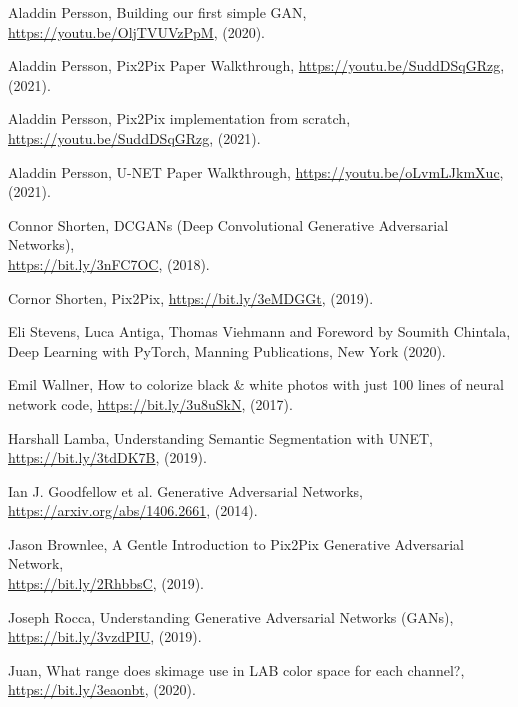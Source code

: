 \documentclass[a4paper]{article}
\begin{document}
\begin{thebibliography}{80}\label{references}

     Aladdin Persson, Building our first simple GAN, \href{https://youtu.be/OljTVUVzPpM}{https://youtu.be/OljTVUVzPpM}, (2020).

     Aladdin Persson, Pix2Pix Paper Walkthrough, \href{https://youtu.be/SuddDSqGRzg}{https://youtu.be/SuddDSqGRzg}, (2021).

     Aladdin Persson, Pix2Pix implementation from scratch, \href{https://youtu.be/SuddDSqGRzg}{https://youtu.be/SuddDSqGRzg}, (2021).

     Aladdin Persson, U-NET Paper Walkthrough, \href{https://youtu.be/oLvmLJkmXuc}{https://youtu.be/oLvmLJkmXuc}, (2021).

     Connor Shorten, DCGANs (Deep Convolutional Generative Adversarial Networks),\\ \href{https://bit.ly/3nFC7OC}{https://bit.ly/3nFC7OC}, (2018).

     Cornor Shorten, Pix2Pix, \href{https://bit.ly/3eMDGGt}{https://bit.ly/3eMDGGt}, (2019).

     Eli Stevens, Luca Antiga, Thomas Viehmann and Foreword by Soumith Chintala, Deep Learning with PyTorch, Manning Publications, New York (2020).

     Emil Wallner, How to colorize black \& white photos with just 100 lines of neural network code, \href{https://bit.ly/3u8uSkN}{https://bit.ly/3u8uSkN}, (2017).

     Harshall Lamba, Understanding Semantic Segmentation with UNET, \href{https://bit.ly/3tdDK7B}{https://bit.ly/3tdDK7B}, (2019).

     Ian J. Goodfellow et al. Generative Adversarial Networks, \href{https://arxiv.org/abs/1406.2661}{https://arxiv.org/abs/1406.2661}, (2014).

     Jason Brownlee, A Gentle Introduction to Pix2Pix Generative Adversarial Network,\\ \href{https://bit.ly/2RhbbsC}{https://bit.ly/2RhbbsC}, (2019).

     Joseph Rocca, Understanding Generative Adversarial Networks (GANs), \href{https://bit.ly/3vzdPIU}{https://bit.ly/3vzdPIU}, (2019).

     Juan, What range does skimage use in LAB color space for each channel?, \href{https://bit.ly/3eaonbt}{https://bit.ly/3eaonbt}, (2020).


\end{thebibliography}
\end{document}
